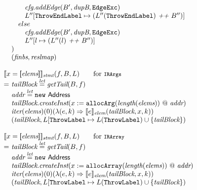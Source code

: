 \[\begin{array}{l@{}l@{~}l}
& & \quad \phantom{if} \emph{cfg}.\emph{addEdge}(B', \emph{dupB}, \EdgeExc)\\
& & \quad \phantom{if} L''[\ThrowEndLabel \mapsto (L''(\ThrowEndLabel) ~\emph{++}~ B'')]\\
& & \quad else\\
& & \quad \phantom{if} \emph{cfg}.\emph{addEdge}(B', \emph{dupB}, \EdgeExc)\\
& & \quad \phantom{if} L''[l \mapsto (L''(l) ~\emph{++}~ B'')]\\
& & )\\
& & (\emph{finbs}, \emph{reslmap})\\
& & \\

\lefteqn{\transfun{\irarray{x}{\emph{elems}}}_{\emph{stmt}}(f, B, L)\qquad \mbox{for \mtt{IRArgs}}}\\
& = & \emph{tailBlock} \letval \getTail(B, f)\\
& & \emph{addr} \letval \new\ \Address\\
& & \emph{tailBlock}.\emph{createInst}(x := \TT{allocArg}(\length(\emph{elems})) ~@~ \emph{addr})\\
& & \iter(\emph{elems})(0)(\lambda(e,k) \Rightarrow \transfun{e}_{\emph{elem}}(\emph{tailBlock}, x, k))\\
& & (\emph{tailBlock}, L[\ThrowLabel \mapsto L(\ThrowLabel) \cup \{ \emph{tailBlock} \})\\
& & \\

\lefteqn{\transfun{\irarray{x}{\emph{elems}}}_{\emph{stmt}}(f, B, L)\qquad \mbox{for \mtt{IRArray}}}\\
& = & \emph{tailBlock} \letval \getTail(B, f)\\
& & \emph{addr} \letval \new\ \Address\\
& & \emph{tailBlock}.\emph{createInst}(x :=\TT{allocArray}(\length(\emph{elems})) ~@~ \emph{addr})\\
& & \iter(\emph{elems})(0)(\lambda(e,k) \Rightarrow \transfun{e}_{\emph{elem}}(\emph{tailBlock}, x, k))\\
& & (\emph{tailBlock}, L[\ThrowLabel \mapsto L(\ThrowLabel) \cup \{ \emph{tailBlock} \})\\
& & \\



\end{array}\]
